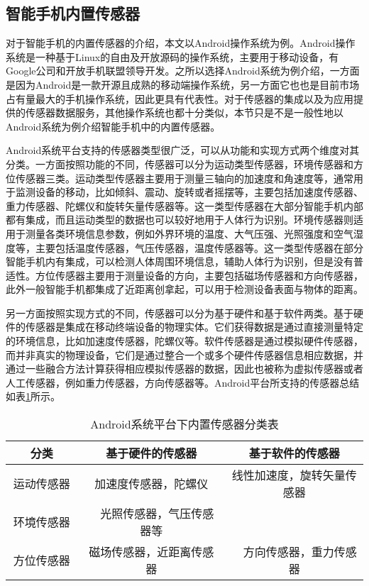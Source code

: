 \subsection{智能手机内置传感器}
\par 对于智能手机的内置传感器的介绍，本文以Android操作系统为例。Android操作系统是一种基于Linux的自由及开放源码的操作系统，主要用于移动设备，有Google公司和开放手机联盟领导开发。之所以选择Android系统为例介绍，一方面是因为Android是一款开源且成熟的移动端操作系统，另一方面它也也是目前市场占有量最大的手机操作系统，因此更具有代表性。对于传感器的集成以及为应用提供的传感器数据服务，其他操作系统也都十分类似，本节只是不是一般性地以Android系统为例介绍智能手机中的内置传感器。
\par Android系统平台支持的传感器类型很广泛，可以从功能和实现方式两个维度对其分类。一方面按照功能的不同，传感器可以分为运动类型传感器，环境传感器和方位传感器三类。运动类型传感器主要用于测量三轴向的加速度和角速度等，通常用于监测设备的移动，比如倾斜、震动、旋转或者摇摆等，主要包括加速度传感器、重力传感器、陀螺仪和旋转矢量传感器等。这一类型传感器在大部分智能手机内部都有集成，而且运动类型的数据也可以较好地用于人体行为识别。环境传感器则适用于测量各类环境信息参数，例如外界环境的温度、大气压强、光照强度和空气湿度等，主要包括温度传感器，气压传感器，温度传感器等。这一类型传感器在部分智能手机内有集成，可以检测人体周围环境信息，辅助人体行为识别，但是没有普适性。方位传感器主要用于测量设备的方向，主要包括磁场传感器和方向传感器，此外一般智能手机都集成了近距离创拿起，可以用于检测设备表面与物体的距离。
\par 另一方面按照实现方式的不同，传感器可以分为基于硬件和基于软件两类。基于硬件的传感器是集成在移动终端设备的物理实体。它们获得数据是通过直接测量特定的环境信息，比如加速度传感器，陀螺仪等。软件传感器是通过模拟硬件传感器，而并非真实的物理设备，它们是通过整合一个或多个硬件传感器信息相应数据，并通过一些融合方法计算获得相应模拟传感器的数据，因此也被称为虚拟传感器或者人工传感器，例如重力传感器，方向传感器等。Android平台所支持的传感器总结如表\ref{sensors}所示。

\begin{table}[htbp]
\centering
\caption{Android系统平台下内置传感器分类表} \label{sensors}
\begin{tabular}{|c|c|c|}
    \hline
    分类 & 基于硬件的传感器　& 基于软件的传感器 \\
    \hline
    运动传感器 & 加速度传感器，陀螺仪 & 线性加速度，旋转矢量传感器\\
    \hline
    环境传感器　&　光照传感器，气压传感器等　&  \\
    \hline
    方位传感器　& 磁场传感器，近距离传感器　&　方向传感器，重力传感器 \\
    \hline
\end{tabular}
\end{table}

